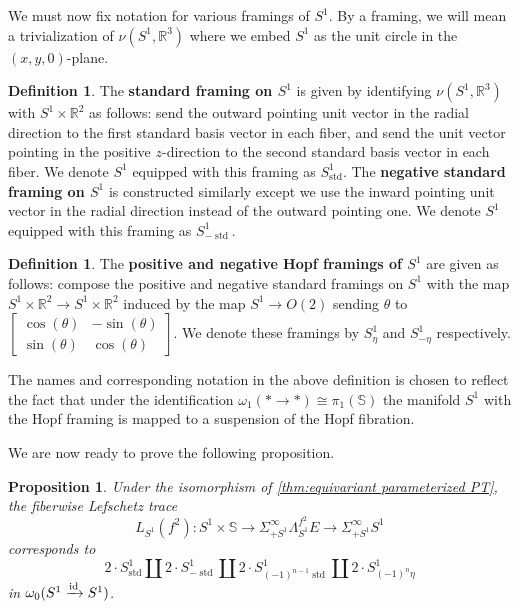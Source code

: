 \documentclass[11pt]{amsart}
\newcommand{\R}{\mathbb R}
\newcommand{\Sph}{\mathbb{S}}
\newcommand{\id}{\textup{id}}
\DeclareMathOperator{\std}{std}
\theoremstyle{plain}   %
\newtheorem{prop}[thm]{Proposition}
\theoremstyle{definition}
\newtheorem{df}[thm]{Definition}
\theoremstyle{remark}
\numberwithin{equation}{section}
\begin{document}
We must now fix notation for various framings of $S^1$. By a framing, we will mean a trivialization of $\nu(S^1,\R^3)$ where we embed $S^1$ as the unit circle in the $(x,y,0)$-plane.
 
\begin{df}\label{df:standard framings on S^1}
The \textbf{standard framing on $S^1$} is given by identifying $\nu(S^1,\R^3)$ with $S^1\times \R^2$ as follows: send the outward pointing unit vector in the radial direction to the first standard basis vector in each fiber, and send the unit vector pointing in the positive $z$-direction to the second standard basis vector in each fiber. We denote $S^1$ equipped with this framing as $S^1_{\std}$. The \textbf{negative standard framing on $S^1$} is constructed similarly except we use the inward pointing unit vector in the radial direction instead of the outward pointing one. We denote $S^1$ equipped with this framing as $S^1_{-\std}$. 
\end{df}

\begin{df}\label{df:Hopf framings}
The \textbf{positive and negative Hopf framings of $S^1$} are given as follows: compose the positive and negative standard framings on $S^1$ with the map $S^1\times\R^2\to S^1\times\R^2$ induced by the map $S^1\to O(2)$ sending $\theta$ to $\begin{bmatrix}
\cos(\theta) & -\sin(\theta)\\
\sin(\theta)& \cos(\theta)
\end{bmatrix}$. We denote these framings by $S^1_{\eta}$ and $S^1_{-\eta}$ respectively. 
\end{df}

The names and corresponding notation in the above definition is chosen to reflect the fact that under the identification $\omega_1(*\to *)\cong\pi_1(\Sph)$ the manifold $S^1$ with the Hopf framing is mapped to a suspension of the Hopf fibration. 

We are now ready to prove the following proposition. 

\begin{prop}\label{prop:fiberwise Lefschetz cobordism class}
Under the isomorphism of \cref{thm:equivariant parameterized PT}, the fiberwise Lefschetz trace
\[
L_{S^1}(f^2) :S^1\times \Sph \to \Sigma_{+S^1}^\infty \Lambda_{S^1}^{f^2} E \to \Sigma_{+S^1}^\infty S^1
\]
corresponds to 
\[
2\cdot S^1_{\std} \amalg 2\cdot S^1_{-\std} \amalg 2\cdot S^1_{(-1)^{n-1}\std} \amalg 2\cdot S^1_{(-1)^n\eta}
\]
in $\omega_0(S^1\xrightarrow{\id} S^1)$.
\end{prop}
\end{document}

